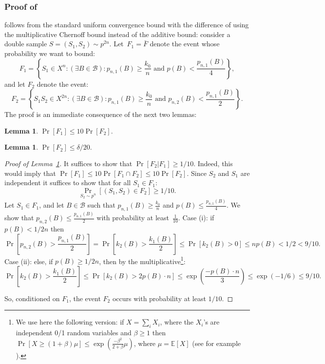 \documentclass{article}
\def\B{{\mathcal B}}
\newcommand{\samp}{S}
\newcommand{\Ex}{\mathbb{E}} %
\newtheorem{lemma}[theorem]{Lemma}
\begin{document}
\subsubsection{Proof of }
 follows from the standard uniform convergence bound with
the difference of using the multiplicative Chernoff bound instead
of the additive bound:
consider a double sample $S=(\samp_1,\samp_2)\sim p^{2n}$.
Let~$F_1 = \bar F$ denote the event whose probability we want to bound:
\[
F_1 =\left\{ S_1\in X^n : (\exists {B\in\B}):
  p_{n,1}(B) \geq \frac{k_0}{n} \mbox{ and } p(B) < \frac{p_{n,1}(B)}{4}\right\}, 
\]
and let $F_2$ denote the event:
\[
F_2 = 
\left\{ S_1S_2\in X^{2n} : (\exists {B\in\B}):
  p_{n,1}(B) \geq \frac{k_0}{n} \mbox{ and } p_{n,2}(B) < \frac{p_{n,1}(B)}{2}\right\}.
\]
The proof is an immediate consequence of the next two lemmas:
\begin{lemma}\label{lem:aux11}
$\Pr[F_1]\leq 10\Pr[F_2].$
\end{lemma}
\begin{lemma}\label{lem:aux12}
$\Pr[F_2]\leq \delta/20.$
\end{lemma}
\begin{proof}[Proof of Lemma~\ref{lem:aux11}]
It suffices to show that $\Pr[F_2 \vert F_1]\geq 1/10$.
	Indeed, this would imply that $\Pr[F_1] \leq 10\Pr[F_1 \cap F_2]\leq 10\Pr[F_2]$.
	Since $S_2$ and $S_1$ are independent it suffices to show that for all $S_1\in F_1$:
	\[\Pr_{S_2\sim p^n}\left[(S_1,S_2)\in F_2\right] \geq 1/10.\]
	Let $S_1\in F_1$, and let $B\in\B$ such that $p_{n,1}(B)\geq\frac{k_0}{n}$ and $p(B)\leq \frac{p_{n,1}(B)}{4}$.
	We show that $p_{n,2}(B)\leq \frac{p_{n,1}(B)}{2}$ with probability at least~$\frac{1}{10}$.
	Case (i): if $p(B) < 1/2n$ then 
\[
\Pr\left[ p_{n,2}(B) > \frac{p_{n,1}(B)}{2}\right]=\Pr\left[ k_{2}(B) > \frac{k_{1}(B)}{2}\right]
\leq
\Pr\left[ k_{2}(B) > 0 \right]
\leq np(B) < 1/2 < 9/10.
\]
Case (ii): else, if $p(B) \geq 1/2n$, 
	then by the multiplicative\footnote{We use here the following version: if $X=\sum_i X_i$, where the $X_i$'s are independent 0/1 random variables and $\beta\geq 1$ then $\Pr[X\geq (1+\beta)\mu] \leq \exp(\frac{-\beta^2}{2+\beta}\mu)$, where $\mu=\Ex[X]$ (see for example \cite{}).}:
\[
\Pr\left[ k_{2}(B) > \frac{k_{1}(B)}{2}\right]
\leq
\Pr\left[ k_{2}(B) > 2p(B)\cdot n\right]
\leq
\exp\left( \frac{-p(B)\cdot n}{3}\right)\leq \exp(-1/6)\leq 9/10.
\]

So, conditioned on $F_1$, 
the event $F_2$ occurs with probability at least $1/10$.
\end{proof}
\end{document}
